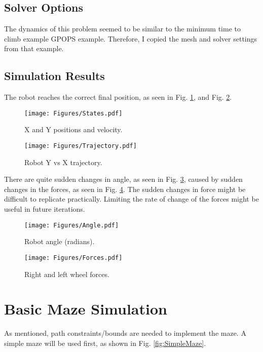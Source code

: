 \documentclass[12pt]{article}
\numberwithin{equation}{section} %
\numberwithin{figure}{section} %
\begin{document}
\subsection{Solver Options}

The dynamics of this problem seemed to be similar to the minimum time to climb example GPOPS example. Therefore, I copied the mesh and solver settings from that example.

\subsection{Simulation Results}
\label{sec:SimResults}

The robot reaches the correct final position, as seen in Fig. \ref{fig:States}, and Fig. \ref{fig:Trajectory}.

\begin{figure}[h!]
	\texttt{[image: Figures/States.pdf]}
	\centering
	\caption{X and Y positions and velocity.}
	\label{fig:States}
\end{figure}

\begin{figure}[h!]
	\texttt{[image: Figures/Trajectory.pdf]}
	\centering
	\caption{Robot Y vs X trajectory.}
	\label{fig:Trajectory}
\end{figure}

There are quite sudden changes in angle, as seen in Fig. \ref{fig:Angle}, caused by sudden changes in the forces, as seen in Fig. \ref{fig:Forces}. The sudden changes in force might be difficult to replicate practically. Limiting the rate of change of the forces might be useful in future iterations.

\begin{figure}[h!]
	\texttt{[image: Figures/Angle.pdf]}
	\centering
	\caption{Robot angle (radians).}
	\label{fig:Angle}
\end{figure}

\begin{figure}[h!]
	\texttt{[image: Figures/Forces.pdf]}
	\centering
	\caption{Right and left wheel forces.}
	\label{fig:Forces}
\end{figure}

\clearpage  %

\section{Basic Maze Simulation}

As mentioned, path constraints/bounds are needed to implement the maze. A simple maze will be used first, as shown in Fig. \ref{fig:SimpleMaze}.
\end{document}
